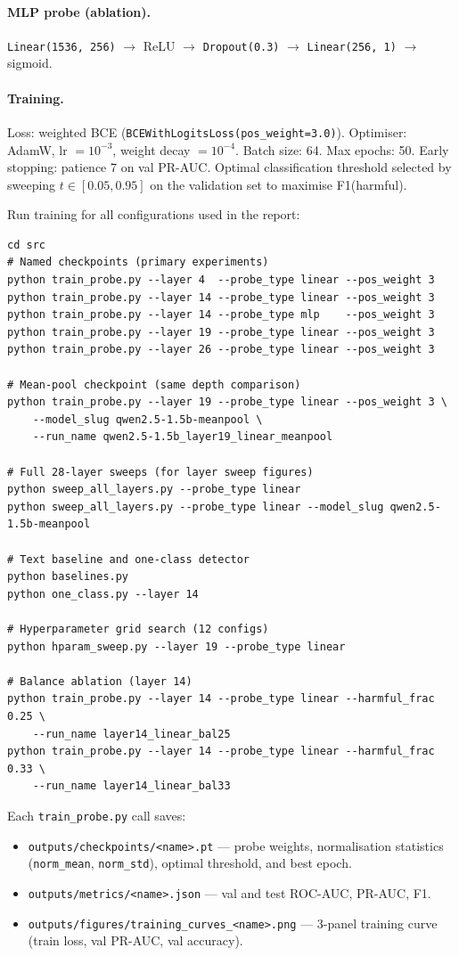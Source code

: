 \documentclass[11pt,a4paper]{article}
\begin{document}
\paragraph{MLP probe (ablation).}
\texttt{Linear(1536, 256)} $\to$ ReLU $\to$ \texttt{Dropout(0.3)} $\to$
\texttt{Linear(256, 1)} $\to$ sigmoid.

\paragraph{Training.}
Loss: weighted BCE (\texttt{BCEWithLogitsLoss(pos\_weight=3.0)}).
Optimiser: AdamW, lr $= 10^{-3}$, weight decay $= 10^{-4}$.
Batch size: 64. Max epochs: 50. Early stopping: patience 7 on val PR-AUC.
Optimal classification threshold selected by sweeping $t \in [0.05, 0.95]$
on the validation set to maximise F1(harmful).

Run training for all configurations used in the report:

\begin{lstlisting}
cd src
# Named checkpoints (primary experiments)
python train_probe.py --layer 4  --probe_type linear --pos_weight 3
python train_probe.py --layer 14 --probe_type linear --pos_weight 3
python train_probe.py --layer 14 --probe_type mlp    --pos_weight 3
python train_probe.py --layer 19 --probe_type linear --pos_weight 3
python train_probe.py --layer 26 --probe_type linear --pos_weight 3

# Mean-pool checkpoint (same depth comparison)
python train_probe.py --layer 19 --probe_type linear --pos_weight 3 \
    --model_slug qwen2.5-1.5b-meanpool \
    --run_name qwen2.5-1.5b_layer19_linear_meanpool

# Full 28-layer sweeps (for layer sweep figures)
python sweep_all_layers.py --probe_type linear
python sweep_all_layers.py --probe_type linear --model_slug qwen2.5-1.5b-meanpool

# Text baseline and one-class detector
python baselines.py
python one_class.py --layer 14

# Hyperparameter grid search (12 configs)
python hparam_sweep.py --layer 19 --probe_type linear

# Balance ablation (layer 14)
python train_probe.py --layer 14 --probe_type linear --harmful_frac 0.25 \
    --run_name layer14_linear_bal25
python train_probe.py --layer 14 --probe_type linear --harmful_frac 0.33 \
    --run_name layer14_linear_bal33
\end{lstlisting}

Each \texttt{train\_probe.py} call saves:
\begin{itemize}[noitemsep]
  \item \texttt{outputs/checkpoints/<name>.pt} — probe weights, normalisation
        statistics (\texttt{norm\_mean}, \texttt{norm\_std}), optimal threshold,
        and best epoch.
  \item \texttt{outputs/metrics/<name>.json} — val and test ROC-AUC, PR-AUC, F1.
  \item \texttt{outputs/figures/training\_curves\_<name>.png} — 3-panel training
        curve (train loss, val PR-AUC, val accuracy).
\end{itemize}
\end{document}
